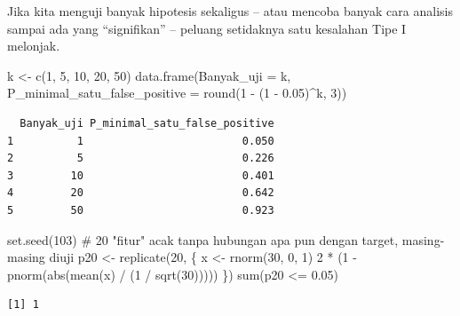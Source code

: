 \documentclass[
  indonesian,
  letterpaper,
]{book}
\newenvironment{Shaded}{\begin{snugshade}}{\end{snugshade}}
\newcommand{\AttributeTok}[1]{\textcolor[rgb]{0.40,0.45,0.13}{#1}}
\newcommand{\CommentTok}[1]{\textcolor[rgb]{0.37,0.37,0.37}{#1}}
\newcommand{\DecValTok}[1]{\textcolor[rgb]{0.68,0.00,0.00}{#1}}
\newcommand{\FloatTok}[1]{\textcolor[rgb]{0.68,0.00,0.00}{#1}}
\newcommand{\FunctionTok}[1]{\textcolor[rgb]{0.28,0.35,0.67}{#1}}
\newcommand{\NormalTok}[1]{\textcolor[rgb]{0.00,0.23,0.31}{#1}}
\newcommand{\OtherTok}[1]{\textcolor[rgb]{0.00,0.23,0.31}{#1}}
\newcommand{\SpecialCharTok}[1]{\textcolor[rgb]{0.37,0.37,0.37}{#1}}
\begin{document}
Jika kita menguji banyak hipotesis sekaligus -- atau mencoba banyak cara
analisis sampai ada yang ``signifikan'' -- peluang setidaknya satu
kesalahan Tipe I melonjak.

\begin{Shaded}
\begin{Highlighting}[]
\NormalTok{k }\OtherTok{\textless{}{-}} \FunctionTok{c}\NormalTok{(}\DecValTok{1}\NormalTok{, }\DecValTok{5}\NormalTok{, }\DecValTok{10}\NormalTok{, }\DecValTok{20}\NormalTok{, }\DecValTok{50}\NormalTok{)}
\FunctionTok{data.frame}\NormalTok{(}\AttributeTok{Banyak\_uji =}\NormalTok{ k,}
           \AttributeTok{P\_minimal\_satu\_false\_positive =} \FunctionTok{round}\NormalTok{(}\DecValTok{1} \SpecialCharTok{{-}}\NormalTok{ (}\DecValTok{1} \SpecialCharTok{{-}} \FloatTok{0.05}\NormalTok{)}\SpecialCharTok{\^{}}\NormalTok{k, }\DecValTok{3}\NormalTok{))}
\end{Highlighting}
\end{Shaded}

\begin{verbatim}
  Banyak_uji P_minimal_satu_false_positive
1          1                         0.050
2          5                         0.226
3         10                         0.401
4         20                         0.642
5         50                         0.923
\end{verbatim}

\begin{Shaded}
\begin{Highlighting}[]
\FunctionTok{set.seed}\NormalTok{(}\DecValTok{103}\NormalTok{)}
\CommentTok{\# 20 "fitur" acak tanpa hubungan apa pun dengan target, masing{-}masing diuji}
\NormalTok{p20 }\OtherTok{\textless{}{-}} \FunctionTok{replicate}\NormalTok{(}\DecValTok{20}\NormalTok{, \{}
\NormalTok{  x }\OtherTok{\textless{}{-}} \FunctionTok{rnorm}\NormalTok{(}\DecValTok{30}\NormalTok{, }\DecValTok{0}\NormalTok{, }\DecValTok{1}\NormalTok{)}
  \DecValTok{2} \SpecialCharTok{*}\NormalTok{ (}\DecValTok{1} \SpecialCharTok{{-}} \FunctionTok{pnorm}\NormalTok{(}\FunctionTok{abs}\NormalTok{(}\FunctionTok{mean}\NormalTok{(x) }\SpecialCharTok{/}\NormalTok{ (}\DecValTok{1} \SpecialCharTok{/} \FunctionTok{sqrt}\NormalTok{(}\DecValTok{30}\NormalTok{)))))}
\NormalTok{\})}
\FunctionTok{sum}\NormalTok{(p20 }\SpecialCharTok{\textless{}=} \FloatTok{0.05}\NormalTok{)}
\end{Highlighting}
\end{Shaded}

\begin{verbatim}
[1] 1
\end{verbatim}
\end{document}
